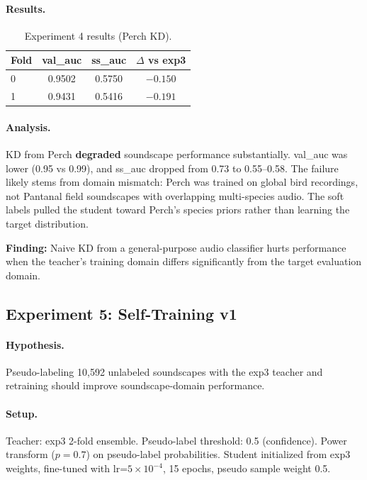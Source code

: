 \paragraph{Results.}
\begin{table}[h]
\centering
\caption{Experiment 4 results (Perch KD).}
\label{tab:exp4}
\begin{tabular}{lccc}
\hline
\textbf{Fold} & \textbf{val\_auc} & \textbf{ss\_auc} & \textbf{$\Delta$ vs exp3} \\
\hline
0 & 0.9502 & 0.5750 & $-0.150$ \\
1 & 0.9431 & 0.5416 & $-0.191$ \\
\hline
\end{tabular}
\end{table}

\paragraph{Analysis.}
KD from Perch \textbf{degraded} soundscape performance substantially.
val\_auc was lower (0.95 vs 0.99), and ss\_auc dropped from 0.73 to 0.55--0.58.
The failure likely stems from domain mismatch: Perch was trained on global bird
recordings, not Pantanal field soundscapes with overlapping multi-species audio.
The soft labels pulled the student toward Perch's species priors rather than
learning the target distribution.

\textbf{Finding:} Naive KD from a general-purpose audio classifier hurts
performance when the teacher's training domain differs significantly from
the target evaluation domain.

\subsection{Experiment 5: Self-Training v1}
\label{sec:exp5}

\paragraph{Hypothesis.}
Pseudo-labeling 10,592 unlabeled soundscapes with the exp3 teacher and
retraining should improve soundscape-domain performance.

\paragraph{Setup.}
Teacher: exp3 2-fold ensemble. Pseudo-label threshold: 0.5 (confidence).
Power transform ($p=0.7$) on pseudo-label probabilities.
Student initialized from exp3 weights, fine-tuned with
lr=$5 \times 10^{-4}$, 15 epochs, pseudo sample weight 0.5.

